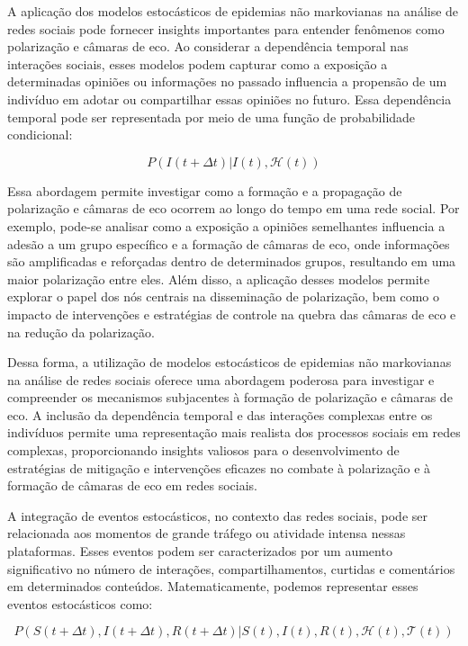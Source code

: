 A aplicação dos modelos estocásticos de epidemias não markovianas na análise de redes sociais pode fornecer insights importantes para entender fenômenos como polarização e câmaras de eco. Ao considerar a dependência temporal nas interações sociais, esses modelos podem capturar como a exposição a determinadas opiniões ou informações no passado influencia a propensão de um indivíduo em adotar ou compartilhar essas opiniões no futuro. Essa dependência temporal pode ser representada por meio de uma função de probabilidade condicional:

\begin{equation}
P(I(t+\Delta t)|I(t), \mathcal{H}(t))
\end{equation}

Essa abordagem permite investigar como a formação e a propagação de polarização e câmaras de eco ocorrem ao longo do tempo em uma rede social. Por exemplo, pode-se analisar como a exposição a opiniões semelhantes influencia a adesão a um grupo específico e a formação de câmaras de eco, onde informações são amplificadas e reforçadas dentro de determinados grupos, resultando em uma maior polarização entre eles. Além disso, a aplicação desses modelos permite explorar o papel dos nós centrais na disseminação de polarização, bem como o impacto de intervenções e estratégias de controle na quebra das câmaras de eco e na redução da polarização.

Dessa forma, a utilização de modelos estocásticos de epidemias não markovianas na análise de redes sociais oferece uma abordagem poderosa para investigar e compreender os mecanismos subjacentes à formação de polarização e câmaras de eco. A inclusão da dependência temporal e das interações complexas entre os indivíduos permite uma representação mais realista dos processos sociais em redes complexas, proporcionando insights valiosos para o desenvolvimento de estratégias de mitigação e intervenções eficazes no combate à polarização e à formação de câmaras de eco em redes sociais.

A integração de eventos estocásticos, no contexto das redes sociais, pode ser relacionada aos momentos de grande tráfego ou atividade intensa nessas plataformas. Esses eventos podem ser caracterizados por um aumento significativo no número de interações, compartilhamentos, curtidas e comentários em determinados conteúdos. Matematicamente, podemos representar esses eventos estocásticos como:

\begin{equation}
P(S(t+\Delta t), I(t+\Delta t), R(t+\Delta t)|S(t), I(t), R(t), \mathcal{H}(t), \mathcal{T}(t))
\end{equation}

